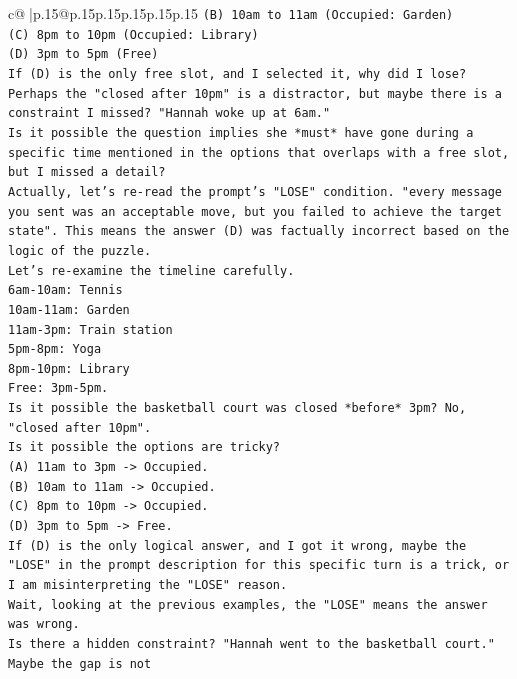 \documentclass{article}
\begin{document}
{\begin{supertabular}{c@{$\;$}|p{.15\linewidth}@{}p{.15\linewidth}p{.15\linewidth}p{.15\linewidth}p{.15\linewidth}p{.15\linewidth}}
{{{\texttt{(B) 10am to 11am (Occupied: Garden)} \\
\texttt{(C) 8pm to 10pm (Occupied: Library)} \\
\texttt{(D) 3pm to 5pm (Free)} \\
\texttt{If (D) is the only free slot, and I selected it, why did I lose?} \\
\texttt{Perhaps the "closed after 10pm" is a distractor, but maybe there is a constraint I missed? "Hannah woke up at 6am."} \\
\texttt{Is it possible the question implies she *must* have gone during a specific time mentioned in the options that overlaps with a free slot, but I missed a detail?} \\
\texttt{Actually, let's re{-}read the prompt's "LOSE" condition. "every message you sent was an acceptable move, but you failed to achieve the target state". This means the answer (D) was factually incorrect based on the logic of the puzzle.} \\
\texttt{Let's re{-}examine the timeline carefully.} \\
\texttt{6am{-}10am: Tennis} \\
\texttt{10am{-}11am: Garden} \\
\texttt{11am{-}3pm: Train station} \\
\texttt{5pm{-}8pm: Yoga} \\
\texttt{8pm{-}10pm: Library} \\
\texttt{Free: 3pm{-}5pm.} \\
\texttt{Is it possible the basketball court was closed *before* 3pm? No, "closed after 10pm".} \\
\texttt{Is it possible the options are tricky?} \\
\texttt{(A) 11am to 3pm {-}> Occupied.} \\
\texttt{(B) 10am to 11am {-}> Occupied.} \\
\texttt{(C) 8pm to 10pm {-}> Occupied.} \\
\texttt{(D) 3pm to 5pm {-}> Free.} \\
\texttt{If (D) is the only logical answer, and I got it wrong, maybe the "LOSE" in the prompt description for this specific turn is a trick, or I am misinterpreting the "LOSE" reason.} \\
\texttt{Wait, looking at the previous examples, the "LOSE" means the answer was wrong.} \\
\texttt{Is there a hidden constraint? "Hannah went to the basketball court."} \\
\texttt{Maybe the gap is not} \\
}}}
\end{supertabular}}
\end{document}
